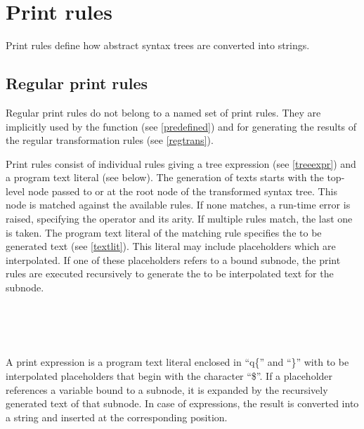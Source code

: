 \chapter{Print rules}\label{print}

Print rules define how abstract syntax trees are converted into
strings.

\section{Regular print rules}\label{regprint}

Regular print rules do not belong to a named set of print rules.
They are implicitly used by the  function
(see \ref{predefined}) and for generating the results of the regular
transformation rules (see \ref{regtrans}).

Print rules consist of individual rules giving a tree expression (see
\ref{treeexpr}) and a program text literal (see below). The generation
of texts starts with the top-level node passed to  or
at the root node of the transformed syntax tree. This node is matched
against the available rules. If none matches, a run-time error is
raised, specifying the operator and its arity. If multiple rules match,
the last one is taken. The program text literal of the matching rule
specifies the to be generated text (see \ref{textlit}). This literal
may include placeholders which are interpolated. If one of these
placeholders refers to a bound subnode, the print rules are executed
recursively to generate the to be interpolated text for the subnode.

\begin{grammar}
      \produces {} 
	 \lextoken{\{} 
	 \lextoken{\}} \\
      \produces {} \\
      \produces {}
	  \\
      \produces {}
	 \lextoken{->} 
\end{grammar}

\noindent
A print expression is a program text literal enclosed in ``q\{'' and
``\}'' with to be interpolated placeholders that begin with the character
``\$''.  If a placeholder references a variable bound to a subnode, it
is expanded by the recursively generated text of that subnode.  In case
of expressions, the result is converted into a string and inserted at
the corresponding position.

